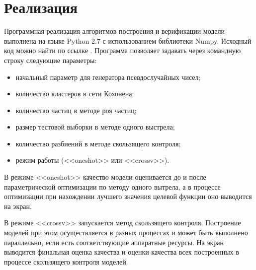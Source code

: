 \section{Реализация}
Программная реализация алгоритмов построения и верификации модели выполнена на языке
Python 2.7 с использованием библиотеки Numpy. Исходный код можно найти по ссылке \cite{sources}.
Программа позволяет задавать через командную строку следующие параметры:
\begin{itemize}
  \item начальный параметр для генератора псевдослучайных чисел;
  \item количество кластеров в сети Кохонена;
  \item количество частиц в методе роя частиц;
  \item размер тестовой выборки в методе одного выстрела;
  \item количество разбиений в методе скользящего контроля;
  \item режим работы (<<oneshot>>  или <<crossv>>).
\end{itemize}
\par
В режиме <<oneshot>> качество модели оценивается до и после параметрической
оптимизации по методу одного вытрела, а в процессе оптимизации при нахождении
лучшего значения целевой функции оно выводится на экран.
\par
В режиме <<crossv>> запускается метод скользящего контроля. Построение моделей при
этом осуществляется в разных процессах и может быть выполнено параллельно, если
есть соответствующие аппаратные ресурсы. На экран выводится финальная оценка качества и
оценки качества всех построенных в процессе скользящего контроля моделей.
